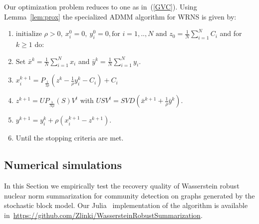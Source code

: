 \documentclass[12pt]{amsart}
\theoremstyle{remark}
\begin{document}
Our optimization problem reduces to one as in~(\ref{GVC}). Using Lemma~\ref{lem:prox} the specialized ADMM algorithm for WRNS is given by:

\begin{enumerate}
\item $\text{initialize } \rho >0, \  x_i^0=0, \  y_i^0=0, \text{for } i=1,..,N \text{ and } z_0= \frac{1}{N}\sum_{i=1}^N C_i$ and for $k\geq 1$ do:
\item $ \text{Set } \bar{x}^{k} = \frac{1}{N}\sum_{i=1}^N x_i $ and $\bar{y}^{k} = \frac{1}{N}\sum_{i=1}^N y_i $.
\item $x_i^{k+1}=P_{\frac{1}{2\rho}}(z^k-\frac{1}{\rho}y_i^k-C_i)+C_i$
\item $z^{k+1} = UP_{\frac{\lambda}{N\rho}}(S)V^t$ with $USV^t = SVD(\bar{x}^{k+1}+\frac{1}{\rho}\bar{y}^k)$.
\item $y^{k+1} =y_i^k + \rho(x_i^{k+1}-z^{k+1}). $ 
\item Until the stopping criteria are met.
\end{enumerate}




\subsection{Numerical simulations}
\label{Numerics}
In this Section we empirically test the recovery quality of Wasserstein robust nuclear norm summarization for community detection on graphs generated by the stochastic block model. 
Our Julia~\cite{Julia} implementation of the algorithm is available in~\url{https://github.com/Zlinki/WassersteinRobustSummarization}.
\end{document}
